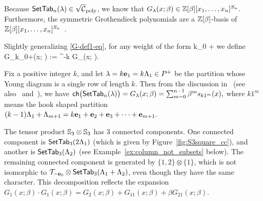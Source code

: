 \documentclass[11pt]{article}
\begin{document}
Because $\mathsf{SetTab}_n(\lambda) \in \sqrt{\mathcal{C}}_{\operatorname{poly}}$, 
we know that $G_{\lambda}(x; \beta) \in \mathbb{Z}[\beta][x_1,\dots,x_n]^{S_n}$.
Furthermore, 
the symmetric Grothendieck polynomials are a $\mathbb{Z}[\beta]$-basis of $\mathbb{Z}[\beta][x_1, \dotsc, x_n]^{S_n}$~\cite{Lenart00}.

Slightly generalizing \eqref{G-def1-eq}, for any weight of the form
\be\label{gen-weight}
k\e_0 + \lambda \in \Lambda \quad {}
\ee
we define
\be
G_{k\e_0+\lambda}(x; \beta) := \beta^{-k} G_{\lambda}(x; \beta).
\ee

\begin{example}
Fix a positive integer $k$, and let $\lambda = k \textbf{e}_1 =  k\Lambda_1 \in P^+$ be the partition whose Young diagram is a single row of length $k$.
Then from the discussion in~\cite[\S6]{Buch2002} (see also~\cite[Rem.~3.7]{MPS21} and~\cite{Lenart00}), we have
$
\mathsf{ch}\bigl( \mathsf{SetTab}_n(\lambda) \bigr) = G_{\lambda}(x; \beta) = \sum_{m=0}^{n-1} \beta^m s_{k1^m}(x),
$
where $k1^m$ means the hook shaped partition $(k-1)\Lambda_1 + \Lambda_{m+1} = k\textbf{e}_1 + \textbf{e}_2 + \textbf{e}_3 + \cdots + \textbf{e}_{m+1}.$ 
\end{example}

\begin{example}
The tensor product $\mathbb{S}_3 \otimes \mathbb{S}_3$ has 3 connected components.
One connected component is $\mathsf{SetTab}_3(2\Lambda_1)$ (which is given by Figure~\ref{fig:S3square_cc}), and another is $\mathsf{SetTab}_3(\Lambda_2)$ (see Example~\ref{ex:column_not_subsets} below).
The remaining connected component is generated by $\{1,2\} \otimes \{1\}$, which is not isomorphic to $\mathcal{T}_{-\textbf{e}_0} \otimes \mathsf{SetTab}_3(\Lambda_1+\Lambda_2)$, even though they have the same character.
This decomposition reflects the expansion
$
G_{1}(x; \beta) \cdot G_{1}(x; \beta) 
= G_{2}(x; \beta) + G_{11}(x; \beta) + \beta G_{21}(x;\beta). 
$
\end{example}
\end{document}
